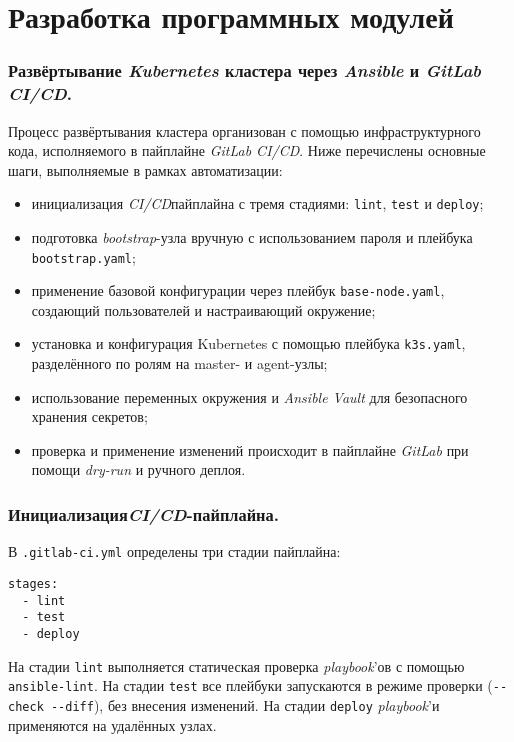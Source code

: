 \section{Разработка программных модулей}
\subsubsection{Развёртывание \textit{Kubernetes} кластера через \textit{Ansible} и \textit{GitLab CI/CD}.} Процесс развёртывания  кластера организован с помощью инфраструктурного кода, исполняемого в пайплайне \textit{GitLab CI/CD}. Ниже перечислены основные шаги, выполняемые в рамках автоматизации:

\begin{itemize}
  \item инициализация \textit{CI/CD}пайплайна с тремя стадиями: \lstinline{lint}, \lstinline{test} и \lstinline{deploy};
  \item подготовка \textit{bootstrap}-узла вручную с использованием пароля и плейбука \lstinline{bootstrap.yaml};
  \item применение базовой конфигурации через плейбук \lstinline{base-node.yaml}, создающий пользователей и настраивающий окружение;
  \item установка и конфигурация Kubernetes с помощью плейбука \lstinline{k3s.yaml}, разделённого по ролям на master- и agent-узлы;
  \item использование переменных окружения и \textit{Ansible Vault} для безопасного хранения секретов;
  \item проверка и применение изменений происходит в пайплайне \textit{GitLab} при помощи \textit{dry-run} и ручного деплоя.
\end{itemize}

\subsubsection{Инициализация\textit{CI/CD}-пайплайна.} В \lstinline{.gitlab-ci.yml} определены три стадии пайплайна:

\begin{lstlisting}
stages:
  - lint
  - test
  - deploy
\end{lstlisting}

На стадии \lstinline{lint} выполняется статическая проверка \textit{playbook}'ов с помощью \lstinline{ansible-lint}. На стадии \lstinline{test} все плейбуки запускаются в режиме проверки (\lstinline{--check --diff}), без внесения изменений. На стадии \lstinline{deploy} \textit{playbook}'и применяются на удалённых узлах.

